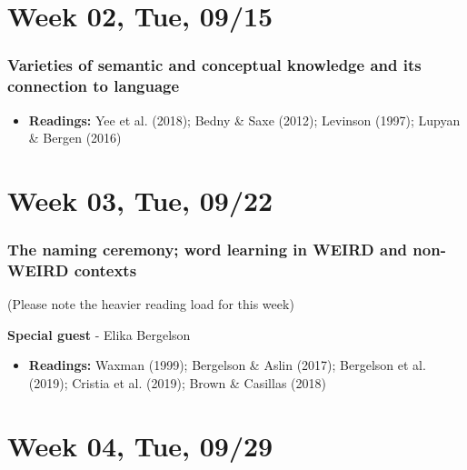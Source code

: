 \documentclass[11pt,man]{article}
\providecommand{\tightlist}{%
  \setlength{\itemsep}{0pt}\setlength{\parskip}{0pt}}
\begin{document}
\hypertarget{week-02-tue-0915}{%
\section{Week 02, Tue, 09/15}\label{week-02-tue-0915}}

\hypertarget{varieties-of-semantic-and-conceptual-knowledge-and-its-connection-to-language}{%
\subsubsection{Varieties of semantic and conceptual knowledge and its
connection to
language}\label{varieties-of-semantic-and-conceptual-knowledge-and-its-connection-to-language}}

\begin{itemize}
\tightlist
\item
  \textbf{Readings:} Yee et al. (2018); Bedny \& Saxe (2012); Levinson
  (1997); Lupyan \& Bergen (2016)
\end{itemize}

\hypertarget{week-03-tue-0922}{%
\section{Week 03, Tue, 09/22}\label{week-03-tue-0922}}

\hypertarget{the-naming-ceremony-word-learning-in-weird-and-non-weird-contexts}{%
\subsubsection{The naming ceremony; word learning in WEIRD and non-WEIRD
contexts}\label{the-naming-ceremony-word-learning-in-weird-and-non-weird-contexts}}

(Please note the heavier reading load for this week)

\textbf{Special guest} - Elika Bergelson

\begin{itemize}
\tightlist
\item
  \textbf{Readings:} Waxman (1999); Bergelson \& Aslin (2017); Bergelson
  et al. (2019); Cristia et al. (2019); Brown \& Casillas (2018)
\end{itemize}

\hypertarget{week-04-tue-0929}{%
\section{Week 04, Tue, 09/29}\label{week-04-tue-0929}}
\end{document}
